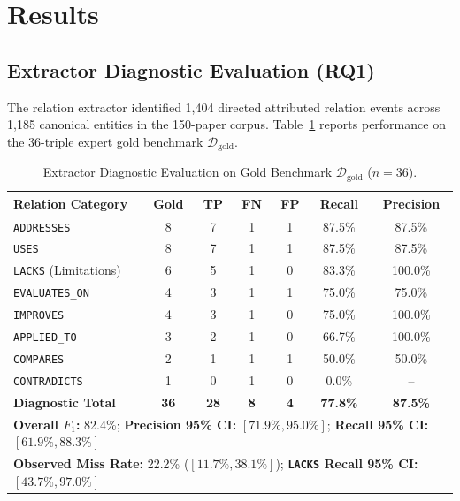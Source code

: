 \documentclass[runningheads]{llncs}
\begin{document}
\section{Results}
\label{sec:results}

\subsection{Extractor Diagnostic Evaluation (RQ1)}
The relation extractor identified 1,404 directed attributed relation events across 1,185 canonical entities in the 150-paper corpus. Table~\ref{tab:gold} reports performance on the 36-triple expert gold benchmark $\mathcal{D}_{\text{gold}}$.

\begin{table}[htbp]
\centering
\caption{Extractor Diagnostic Evaluation on Gold Benchmark $\mathcal{D}_{\text{gold}}$ ($n = 36$).}
\label{tab:gold}
\scriptsize
\setlength{\tabcolsep}{3pt}
\renewcommand{\arraystretch}{0.92}
\begin{tabular}{lcccccc}
\toprule
\textbf{Relation Category} & \textbf{Gold} & \textbf{TP} & \textbf{FN} & \textbf{FP} & \textbf{Recall} & \textbf{Precision} \\
\midrule
\texttt{ADDRESSES} & 8 & 7 & 1 & 1 & 87.5\% & 87.5\% \\
\texttt{USES} & 8 & 7 & 1 & 1 & 87.5\% & 87.5\% \\
\texttt{LACKS} (Limitations) & 6 & 5 & 1 & 0 & 83.3\% & 100.0\% \\
\texttt{EVALUATES\_ON} & 4 & 3 & 1 & 1 & 75.0\% & 75.0\% \\
\texttt{IMPROVES} & 4 & 3 & 1 & 0 & 75.0\% & 100.0\% \\
\texttt{APPLIED\_TO} & 3 & 2 & 1 & 0 & 66.7\% & 100.0\% \\
\texttt{COMPARES} & 2 & 1 & 1 & 1 & 50.0\% & 50.0\% \\
\texttt{CONTRADICTS} & 1 & 0 & 1 & 0 & 0.0\% & -- \\
\midrule
\textbf{Diagnostic Total} & \textbf{36} & \textbf{28} & \textbf{8} & \textbf{4} & \textbf{77.8\%} & \textbf{87.5\%} \\
\midrule
\multicolumn{7}{l}{\textbf{Overall $F_1$:} 82.4\%; \textbf{Precision 95\% CI:} $[71.9\%, 95.0\%]$; \textbf{Recall 95\% CI:} $[61.9\%, 88.3\%]$} \\
\multicolumn{7}{l}{\textbf{Observed Miss Rate:} 22.2\% ($[11.7\%, 38.1\%]$); \textbf{\texttt{LACKS} Recall 95\% CI:} $[43.7\%, 97.0\%]$} \\
\bottomrule
\end{tabular}
\end{table}
\end{document}
